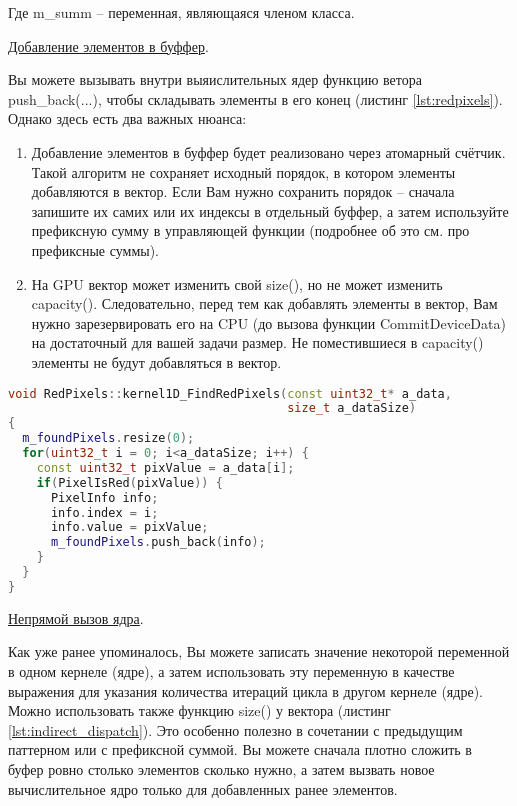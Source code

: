 \documentclass[11pt,fleqn,english,russian]{report} %
\begin{document}
Где m\_summ -- переменная, являющаяся членом класса.

\noindent\underline{Добавление элементов в буффер}.

Вы можете вызывать внутри выяислительных ядер функцию ветора push\_back(...), чтобы складывать элементы в его конец (листинг \ref{lst:redpixels}). Однако здесь есть два важных нюанса:

\begin{enumerate}
\item Добавление элементов в буффер будет реализовано через атомарный счётчик. Такой алгоритм не сохраняет исходный порядок, в котором элементы добавляются в вектор. Если Вам нужно сохранить порядок -- сначала запишите их самих или их индексы в отдельный буффер, а затем используйте префиксную сумму в управляющей функции (подробнее об это см. про префиксные суммы).
\item На GPU вектор может изменить свой size(), но не может изменить capacity(). Следовательно, перед тем как добавлять элементы в вектор, Вам нужно зарезервировать его на CPU (до вызова функции CommitDeviceData) на достаточный для вашей задачи размер. Не поместившиеся в capacity() элементы не будут добавляться в вектор.
\end{enumerate}

\begin{lstlisting}[language=C++, 
	               caption=добавление элементов в конец буффера, 
	               label=lst:redpixels]	
void RedPixels::kernel1D_FindRedPixels(const uint32_t* a_data, 
                                       size_t a_dataSize)
{
  m_foundPixels.resize(0);
  for(uint32_t i = 0; i<a_dataSize; i++) {
    const uint32_t pixValue = a_data[i];
    if(PixelIsRed(pixValue)) {
      PixelInfo info;
      info.index = i;
      info.value = pixValue;
      m_foundPixels.push_back(info);
    }
  }
}
\end{lstlisting}

\noindent\underline{Непрямой вызов ядра}.

Как уже ранее упоминалось, Вы можете записать значение некоторой переменной в одном кернеле (ядре), а затем использовать эту переменную в качестве выражения для указания количества итераций цикла в другом кернеле (ядре). Можно использовать также функцию size() у вектора (листинг \ref{lst:indirect_dispatch}). Это особенно полезно в сочетании с предыдущим паттерном или с префиксной суммой. Вы можете сначала плотно сложить в буфер ровно столько элементов сколько нужно, а затем вызвать новое вычислительное ядро только для добавленных ранее элементов.
\end{document}
